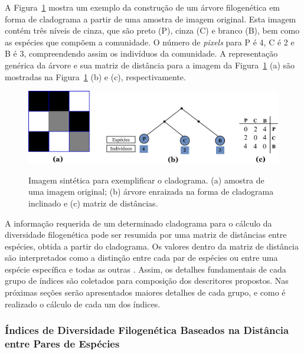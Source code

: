 A Figura~\ref{fig:ExemploCladograma} mostra um exemplo da construção de um árvore filogenética em forma de cladograma a partir de uma amostra de imagem original. Esta imagem contém três níveis de cinza, que são preto (P), cinza (C) e branco (B), bem como as espécies que compõem a comunidade. O número de \textit{pixels} para P é 4, C é 2 e B é 3, compreendendo assim os indivíduos da comunidade. A representação genérica da árvore e sua matriz de distância para a imagem da Figura~\ref{fig:ExemploCladograma} (a) são mostradas na Figura~\ref{fig:ExemploCladograma} (b) e (c), respectivamente.

\begin{figure}[ht!]
    \centering
    \caption{Imagem sintética para exemplificar o cladograma. (a) amostra de uma imagem original; (b) árvore enraizada na forma de cladograma inclinado e (c) matriz de distâncias.}
     \includegraphics[width=16cm]{figs/ExemploCladogramaFinal.png}
    \label{fig:ExemploCladograma}
\end{figure}
\FloatBarrier

A informação requerida de um determinado cladograma para o cálculo da diversidade filogenética pode ser resumida por uma matriz de distâncias entre espécies, obtida a partir do cladograma. Os valores dentro da matriz de distância são interpretados como a distinção entre cada par de espécies ou entre uma espécie específica e todas as outras \cite{CARVALHO2018210}. Assim, os detalhes fundamentais de cada grupo de índices são coletados para composição dos descritores propostos. Nas próximas seções serão apresentados maiores detalhes de cada grupo, e como é realizado o cálculo de cada um dos índices.


\subsubsection{Índices de Diversidade Filogenética Baseados na Distância entre Pares de Espécies}
\label{sec:indicesPE}

